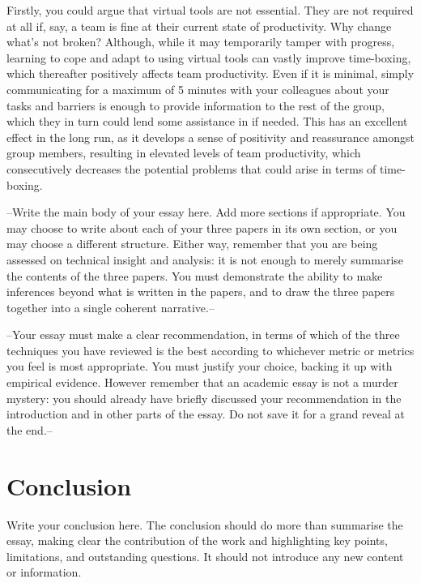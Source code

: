 \documentclass{scrartcl}
\begin{document}
Firstly, you could argue that virtual tools are not essential. They are not required at all if, say, a team is fine at their current state of productivity. Why change what's not broken? Although, while it may temporarily tamper with progress, learning to cope and adapt to using virtual tools can vastly improve time-boxing, which thereafter positively affects team productivity. Even if it is minimal, simply communicating for a maximum of 5 minutes with your colleagues about your tasks and barriers is enough to provide information to the rest of the group, which they in turn could lend some assistance in if needed. This has an excellent effect in the long run, as it develops a sense of positivity and reassurance amongst group members, resulting in elevated levels of team productivity, which consecutively decreases the potential problems that could arise in terms of time-boxing.

--Write the main body of your essay here. Add more sections if appropriate. You may choose to write about each of your three papers in its own section, or you may choose a different structure. Either way, remember that you are being assessed on technical insight and analysis: it is not enough to merely summarise the contents of the three papers. You must demonstrate the ability to make inferences beyond what is written in the papers, and to draw the three papers together into a single coherent narrative.--

--Your essay must make a clear recommendation, in terms of which of the three techniques you have reviewed is the best according to whichever metric or metrics you feel is most appropriate. You must justify your choice, backing it up with empirical evidence. However remember that an academic essay is not a murder mystery: you should already have briefly discussed your recommendation in the introduction and in other parts of the essay. Do not save it for a grand reveal at the end.--

\section{Conclusion}

Write your conclusion here. The conclusion should do more than summarise the essay, making clear the contribution of the work and highlighting key points, limitations, and outstanding questions. It should not introduce any new content or information.



\end{document}
